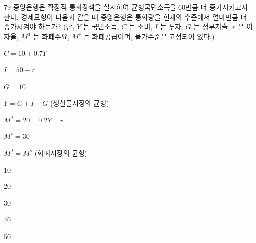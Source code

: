 \begin{question}{79}
중앙은행은 확장적 통화정책을 실시하여 균형국민소득을 60만큼 더 증가시키고자 한다. 경제모형이 다음과 같을 때 중앙은행은 통화량을 현재의 수준에서 얼마만큼 더 증가시켜야 하는가? (단, $Y$ 는 국민소득, $C$ 는 소비, $I$ 는 투자, $G$ 는 정부지출, $r$ 은 이자율, $M^{ d }$ 는 화폐수요, $M^{ s }$ 는 화폐공급이며, 물가수준은 고정되어 있다.)
\begin{framedtext}
$C=10+0.7Y$ \par
$I=50-r$ \par
$G=10$ \par
$Y=C+I+G$ (생산물시장의 균형) \par
$M^{ d } =20+0.2Y-r$ \par
$M^{ s } =30$ \par
$M^{ d } =M^{ s }$ (화폐시장의 균형)
\end{framedtext}
\begin{choices}
  \item 10
  \item 20
  \item 30
  \item 40
  \item 50
\end{choices}
\end{question}

